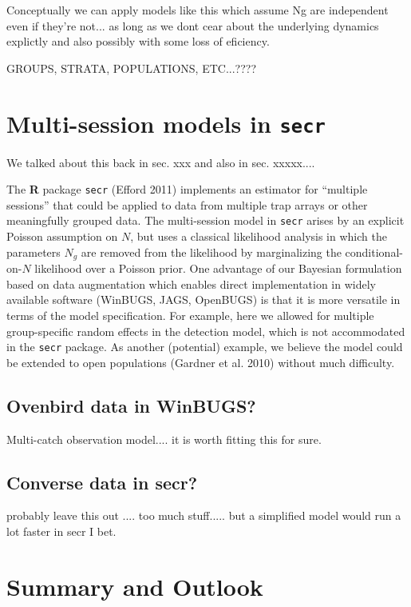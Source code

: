 Conceptually we can apply models like this which assume Ng are
independent even if they're not... as long as we dont cear about the
underlying dynamics explictly and also possibly with some loss of
eficiency. 

GROUPS, STRATA, POPULATIONS, ETC...????

\section{Multi-session models in \mbox{\tt secr}  }

We talked about this back in sec. xxx and also in sec. xxxxx....

The {\bf R} package \mbox{\tt secr} (Efford 2011) implements an
estimator for ``multiple sessions'' that could be applied to data from
multiple trap arrays or other meaningfully grouped data.
 The multi-session
model in \mbox{\tt secr} 
arises by an explicit Poisson assumption on $N$, but uses
 a classical likelihood analysis in which the parameters $N_{g}$
are removed from the likelihood by marginalizing the
conditional-on-$N$ likelihood over a Poisson prior.  One advantage of
our Bayesian formulation based on data augmentation which enables
direct implementation in widely available software (WinBUGS, JAGS,
OpenBUGS) is that it is more versatile in terms of the model
specification. For example, here we allowed for multiple
group-specific random effects in the detection model, which is not
accommodated in the \mbox{\tt secr}
package. As another (potential) example, we believe the model could be
extended to open populations (Gardner et al. 2010) without much
difficulty.

\subsection{Ovenbird data in WinBUGS?}

Multi-catch observation model.... it is worth fitting this for sure.

\subsection{Converse data in secr?}

probably leave this out .... too much stuff..... but a simplified
model would run a lot faster in secr I bet.  

\section{Summary and Outlook}


